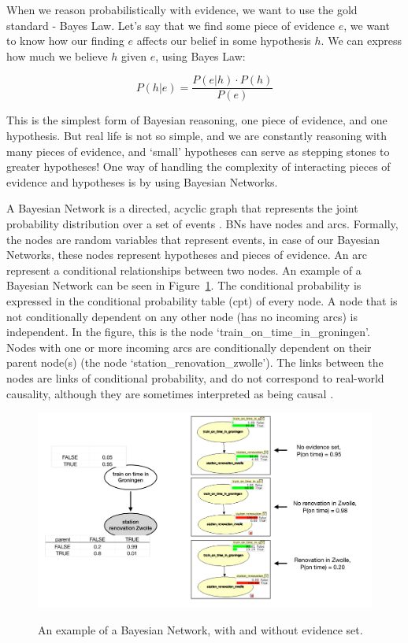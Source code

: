 When we reason probabilistically with evidence, we want to use the gold standard - Bayes Law.
Let's say that we find some piece of evidence $e$, we want to know how our finding $e$ affects our belief in some hypothesis $h$. We can express how much we believe $h$ given $e$, using Bayes Law:

\[ P(h | e) =  \frac{P(e | h) \cdot P(h)}{P(e)}\]


This is the simplest form of Bayesian reasoning, one piece of evidence, and one hypothesis. But real life is not so simple, and we are constantly reasoning with many pieces of evidence, and `small' hypotheses can serve as stepping stones to greater hypotheses! One way of handling the complexity of interacting pieces of evidence and hypotheses is by using Bayesian Networks.

A Bayesian Network is a directed, acyclic graph that represents the joint probability distribution over a set of events \citep{pearl1988}. BNs have nodes and arcs. Formally, the nodes are random variables that represent events, in case of our Bayesian Networks, these nodes represent hypotheses and pieces of evidence. An arc represent a conditional relationships between two nodes. An example of a Bayesian Network can be seen in Figure~\ref{exampleBN}. The conditional probability is expressed in the conditional probability table (cpt) of every node. A node that is not conditionally dependent on any other node (has no incoming arcs) is independent. In the figure, this is the node `train\_on\_time\_in\_groningen'. Nodes with one or more incoming arcs are conditionally dependent on their parent node(s) (the node `station\_renovation\_zwolle'). The links between the nodes are links of conditional probability, and do not correspond to real-world causality, although they are sometimes interpreted as being causal \citep{Dawid2008}.

\begin{figure}[h]
\includegraphics[width=\linewidth]{images/bnExample.pdf}
\label{exampleBN}
\caption{An example of a Bayesian Network, with and without evidence set.}
\end{figure}


